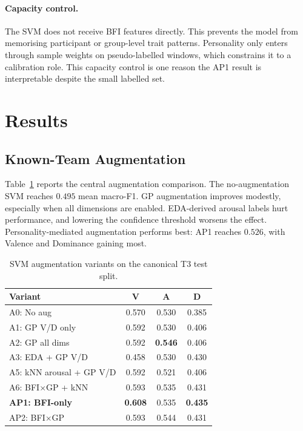 \documentclass[sigconf,review,anonymous]{acmart}
\newcommand{\best}[1]{\textbf{\textcolor{bestcol}{#1}}}
\begin{document}
\paragraph{Capacity control.}
The SVM does not receive BFI features directly.
This prevents the model from memorising participant or group-level trait
patterns.
Personality only enters through sample weights on pseudo-labelled windows,
which constrains it to a calibration role.
This capacity control is one reason the AP1 result is interpretable despite
the small labelled set.

\section{Results}
\label{sec:results}

\subsection{Known-Team Augmentation}
\label{sec:known_team}

Table~\ref{tab:svm_aug} reports the central augmentation comparison.
The no-augmentation SVM reaches $0.495$ mean macro-F1.
GP augmentation improves modestly, especially when all dimensions are enabled.
EDA-derived arousal labels hurt performance, and lowering the confidence
threshold worsens the effect.
Personality-mediated augmentation performs best: AP1 reaches $0.526$, with
Valence and Dominance gaining most.

\begin{table}[t]
\caption{SVM augmentation variants on the canonical T3 test split.}
\label{tab:svm_aug}
\centering
\setlength{\tabcolsep}{4pt}
\small
\begin{tabular}{lccc}
\toprule
\textbf{Variant} & \textbf{V} & \textbf{A} & \textbf{D} \\
\midrule
A0: No aug              & 0.570 & 0.530 & 0.385 \\
A1: GP V/D only         & 0.592 & 0.530 & 0.406 \\
A2: GP all dims         & 0.592 & \best{0.546} & 0.406 \\
A3: EDA + GP V/D        & 0.458 & 0.530 & 0.430 \\
A5: kNN arousal + GP V/D& 0.592 & 0.521 & 0.406 \\
A6: BFI$\times$GP + kNN & 0.593 & 0.535 & 0.431 \\
\midrule
\best{AP1: BFI-only}    & \best{0.608} & 0.535 & \best{0.435} \\
AP2: BFI$\times$GP      & 0.593 & 0.544 & 0.431 \\
\bottomrule
\end{tabular}
\end{table}
\end{document}
